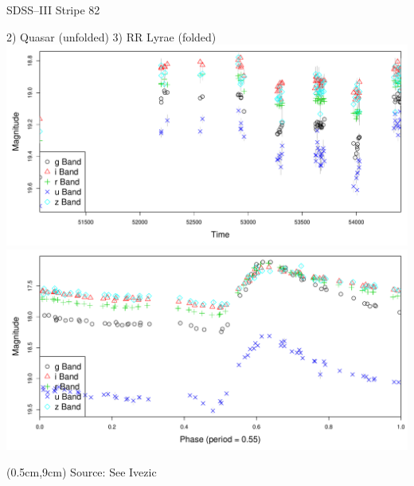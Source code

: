 \documentclass[12pt]{beamer}
\newcommand{\att}[1]{\begin{textblock*}{12cm}(0.5cm,9cm) %
  {\tiny Source: #1}
      \end{textblock*}}
\begin{document}
\begin{frame}{SDSS--III Stripe 82}
\begin{center}
{\small 2) Quasar (unfolded)} \hspace{9 mm} {\small 3) RR Lyrae (folded)}\\
\includegraphics[scale=.15]{figs/unfolded_7904669.pdf}
\includegraphics[scale=.15]{figs/folded_13350.pdf}
\end{center}

\att{See Ivezic \cite{ivezic2007sloan}}

\end{frame}
\end{document}
